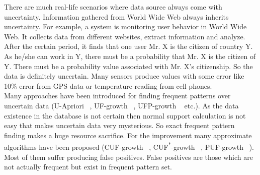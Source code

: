 There are much real-life scenarios where data source always come with uncertainty. Information gathered from World Wide Web always inherits uncertainty. For example, a system is monitoring user behavior in World Wide Web. It collects data from different websites, extract information and analyze. After the certain period, it finds that one user Mr. X is the citizen of country Y. As he/she can work in Y, there must be a probability that Mr. X is the citizen of Y. There must be a probability value associated with Mr. X's citizenship. So the data is definitely uncertain. Many sensors produce values with some error like 10\% error from GPS data or temperature reading from cell phones.\\
Many approaches have been introduced for finding frequent patterns over uncertain data (U-Apriori ~\cite{u_priori}, UF-growth ~\cite{uf_growth}, UFP-growth ~\cite{ufp_growth} etc.). As the data existence in the database is not certain then normal support calculation is not easy that makes uncertain data very mysterious. So exact frequent pattern finding makes a huge resource sacrifice. For the improvement many approximate algorithms have been proposed (CUF-growth ~\cite{cuf_growth}, CUF\textsuperscript{*}-growth ~\cite{cuf_growth}, PUF-growth ~\cite{puf_growth}). Most of them suffer producing false positives. False positives are those which are not actually frequent but exist in frequent pattern set.

